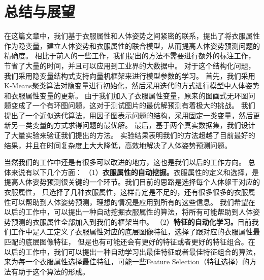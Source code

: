
\chapter{总结与展望}
在这篇文章中，我们基于衣服属性和人体姿势之间紧密的联系，提出了将衣服属性作为隐变量，建立人体姿势和衣服属性的联合模型，从而提高人体姿势预测问题的精确度。
相比于前人的一些工作，我们提出的方法不需要进行额外的标注工作，节省了大量的时间，并且可以应用到工业界的大数据中。
对于这个结构化问题，我们采用隐变量结构式支持向量机框架来进行模型参数的学习。
首先，我们采用K-Means聚类算法对隐变量进行初始化，然后采用迭代的方式进行模型中人体姿势和衣服属性变量的更新。
由于我们加入了衣服属性变量，原来的图画式无环图问题变成了一个有环图问题，这对于测试图片的最优解预测有着极大的挑战。
我们提出了一个近似迭代算法，用因子图表示问题的结构，采用固定一类变量，然后更新另一类变量的方式求得问题的最优解。
最后，基于两个真实数据集，我们设计了大量实验来验证我们提出的方法。
实验结果表明我们的方法超越了目前最好的结果，并且在时间复杂度上大大降低，高效地解决了人体姿势预测问题。

当然我们的工作中还是有很多可以改进的地方，这也是我们以后的工作方向。
总体来说有以下几个方面：
（1）\textbf{衣服属性的自动挖掘。}衣服属性的定义和选择，是提高人体姿势预测很关键的一个环节。我们目前的思路是选择每个人体躯干对应的衣服属性，
只选择了几种衣服属性，这样肯定是不足的，还有很多很多的衣服属性可以帮助到人体姿势预测，理想的情况是应用到所有的这些信息。
我们希望在以后的工作中，可以提出一种自动挖掘衣服属性的算法，将所有可能帮助到人体姿势预测的衣服属性全部加入到我们的框架当中。
（2）\textbf{特征的自动化学习。}目前我们工作中是人工定义了衣服属性对应的底层图像特征，选择了跟对应的衣服属性最匹配的底层图像特征，
但是也有可能还会有更好的特征或者更好的特征组合。在以后的工作中，我们可以提出一种自动学习出最佳特征或者最佳特征组合的算法，
来为每一个衣服属性选择最佳特征，可能一些Feature Selection（特征选择）的方法有助于这个算法的形成。


